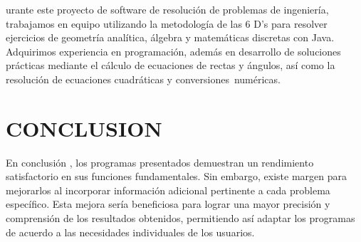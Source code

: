 \documentclass{IEEEcsmag}
\begin{document}
\maketitle
{}urante este proyecto de software de resolución de problemas de ingeniería, trabajamos en equipo utilizando la metodología de las 6 D's para resolver ejercicios de geometría analítica, álgebra y matemáticas discretas con Java. Adquirimos experiencia en programación, además en desarrollo de soluciones prácticas mediante el cálculo de ecuaciones de rectas y ángulos, así como la resolución de ecuaciones cuadráticas y conversiones numéricas.

\clearpage


\clearpage


\clearpage


\clearpage


\clearpage


\clearpage


\clearpage


\section{CONCLUSION}
En conclusión , los programas presentados demuestran un rendimiento satisfactorio en sus funciones fundamentales. Sin embargo, existe margen para mejorarlos al incorporar información adicional pertinente a cada problema específico. Esta mejora sería beneficiosa para lograr una mayor precisión y comprensión de los resultados obtenidos, permitiendo así adaptar los programas de acuerdo a las necesidades individuales de los usuarios.
\vspace*{-8pt}


\def\refname{REFERENCES}
\end{document}
